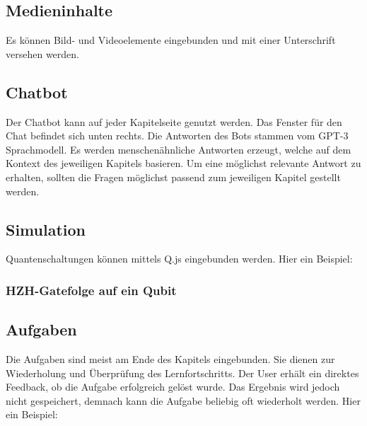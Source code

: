 \subsection[align=left]{Medieninhalte}
Es können Bild- und Videoelemente eingebunden und mit einer Unterschrift versehen werden.

\newline \newline

\subsection[align=left]{Chatbot}
Der Chatbot kann auf jeder Kapitelseite genutzt werden. Das Fenster für den Chat befindet sich unten rechts. Die Antworten des Bots stammen vom GPT-3 Sprachmodell.
Es werden menschenähnliche Antworten erzeugt, welche auf dem Kontext des jeweiligen Kapitels basieren. Um eine möglichst relevante Antwort zu erhalten, sollten die Fragen möglichst passend zum jeweiligen Kapitel gestellt werden. \newline
\newline
\subsection[align=left]{Simulation}
Quantenschaltungen können mittels Q.js eingebunden werden. Hier ein Beispiel: 
\newline
\newline
\subsubsection{HZH-Gatefolge auf ein Qubit}

\newline

\subsection[align=left]{Aufgaben}
Die Aufgaben sind meist am Ende des Kapitels eingebunden. Sie dienen zur Wiederholung und Überprüfung des Lernfortschritts. Der User erhält ein direktes Feedback, ob die Aufgabe erfolgreich gelöst wurde. Das Ergebnis wird jedoch nicht gespeichert, demnach kann die Aufgabe beliebig oft wiederholt werden. Hier ein Beispiel: \newline \newline


\newline


